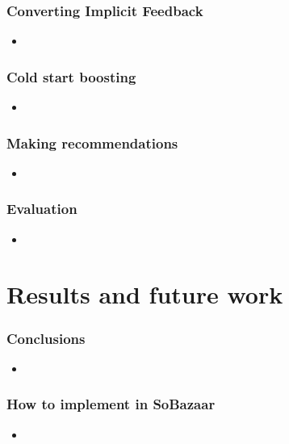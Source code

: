\documentclass{beamer}
\begin{document}
  \begin{frame}
    \frametitle{Converting Implicit Feedback}
    \begin{itemize}
      \item
    \end{itemize}
  \end{frame}

  \begin{frame}
    \frametitle{Cold start boosting}
    \begin{itemize}
      \item
    \end{itemize}
  \end{frame}

  \begin{frame}
    \frametitle{Making recommendations}
    \begin{itemize}
      \item
    \end{itemize}
  \end{frame}

  \begin{frame}
    \frametitle{Evaluation}
    \begin{itemize}
      \item
    \end{itemize}
  \end{frame}

  \section{Results and future work}

  \begin{frame}
    \frametitle{Conclusions}
    \begin{itemize}
      \item
    \end{itemize}
  \end{frame}

  \begin{frame}
    \frametitle{How to implement in SoBazaar}
    \begin{itemize}
      \item
    \end{itemize}
  \end{frame}
\end{document}
